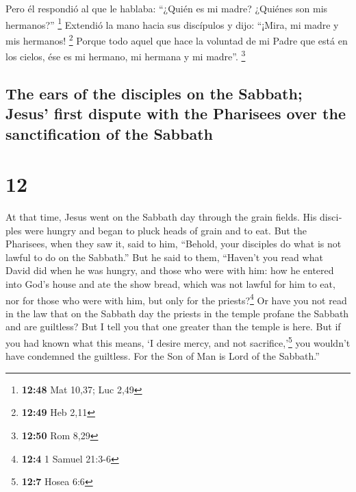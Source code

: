 \begin{paracol}{2}
 Pero él respondió al que le hablaba: ``¿Quién es mi
madre? ¿Quiénes son mis hermanos?'' \footnote{\textbf{12:48} Mat 10,37;
  Luc 2,49}  Extendió la mano hacia sus discípulos y
dijo: ``¡Mira, mi madre y mis hermanos! \footnote{\textbf{12:49} Heb
  2,11}  Porque todo aquel que hace la voluntad de mi
Padre que está en los cielos, ése es mi hermano, mi hermana y mi
madre''. \footnote{\textbf{12:50} Rom 8,29}

\switchcolumn
\begin{otherlanguage}{english}

\hypertarget{the-ears-of-the-disciples-on-the-sabbath-jesus-first-dispute-with-the-pharisees-over-the-sanctification-of-the-sabbath}{%
\subsection{The ears of the disciples on the Sabbath; Jesus' first
dispute with the Pharisees over the sanctification of the
Sabbath}\label{the-ears-of-the-disciples-on-the-sabbath-jesus-first-dispute-with-the-pharisees-over-the-sanctification-of-the-sabbath}}

\hypertarget{section-23}{%
\section{12}\label{section-23}}

 At that time, Jesus went on the Sabbath day through the
grain fields. His disciples were hungry and began to pluck heads of
grain and to eat.  But the Pharisees, when they saw it,
said to him, ``Behold, your disciples do what is not lawful to do on the
Sabbath.''  But he said to them, ``Haven't you read what
David did when he was hungry, and those who were with him:
 how he entered into God's house and ate the show bread,
which was not lawful for him to eat, nor for those who were with him,
but only for the priests?\footnote{\textbf{12:4} 1 Samuel 21:3-6}
 Or have you not read in the law that on the Sabbath day
the priests in the temple profane the Sabbath and are guiltless?
 But I tell you that one greater than the temple is here.
 But if you had known what this means, `I desire mercy,
and not sacrifice,'\footnote{\textbf{12:7} Hosea 6:6} you wouldn't have
condemned the guiltless.  For the Son of Man is Lord of
the Sabbath.''

\hypertarget{healing-of-man-with-paralyzed-arm-on-sabbath-the-second-argument-about-sabbath-keeping}{%
}
\end{otherlanguage}
\end{paracol}
